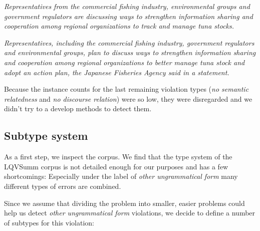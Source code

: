 \documentclass[a4paper,10pt]{scrartcl}
\theoremstyle{style}
\begin{document}
\quad\textit{Representatives from the commercial fishing industry, environmental groups and government regulators are discussing ways to strengthen information sharing and cooperation among regional organizations to track and manage tuna stocks.}

\quad\textit{Representatives, including the commercial fishing industry, government regulators and environmental groups, plan to discuss ways to strengthen information sharing and cooperation among regional organizations to better manage tuna stock and adopt an action plan, the Japanese Fisheries Agency said in a statement.}

Because the instance counts for the last remaining violation types (\textit{no semantic relatedness} and \textit{no discourse relation}) were so low, they were disregarded and we didn't try to a develop methods to detect them.

\subsection{Subtype system}
\label{s_subtypes}

As a first step, we inspect the corpus. We find that the type system of the LQVSumm corpus \citep{friedrichlqvsumm} is not detailed enough for our purposes and has a few shortcomings: Especially under the label of \textit{other ungrammatical form} many different types of errors are combined.

Since we assume that dividing the problem into smaller, easier problems could help us detect \textit{other ungrammatical form} violations, we decide to define a number of subtypes for this violation:
\end{document}

